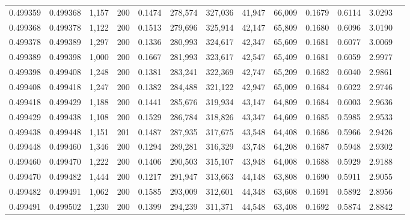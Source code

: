 \begin{tabular}{rrrrrrrrrrrrr}
0.499359 & 0.499368 & 1,157 & 200 &                                     0.1474 & 278,574 & 327,036 &  41,947 &  66,009 & 0.1679 & 0.6114 & 3.0293 \\
0.499368 & 0.499378 & 1,122 & 200 &                                     0.1513 & 279,696 & 325,914 &  42,147 &  65,809 & 0.1680 & 0.6096 & 3.0190 \\
0.499378 & 0.499389 & 1,297 & 200 &                                     0.1336 & 280,993 & 324,617 &  42,347 &  65,609 & 0.1681 & 0.6077 & 3.0069 \\
0.499389 & 0.499398 & 1,000 & 200 &                                     0.1667 & 281,993 & 323,617 &  42,547 &  65,409 & 0.1681 & 0.6059 & 2.9977 \\
0.499398 & 0.499408 & 1,248 & 200 &                                     0.1381 & 283,241 & 322,369 &  42,747 &  65,209 & 0.1682 & 0.6040 & 2.9861 \\
0.499408 & 0.499418 & 1,247 & 200 &                                     0.1382 & 284,488 & 321,122 &  42,947 &  65,009 & 0.1684 & 0.6022 & 2.9746 \\
0.499418 & 0.499429 & 1,188 & 200 &                                     0.1441 & 285,676 & 319,934 &  43,147 &  64,809 & 0.1684 & 0.6003 & 2.9636 \\
0.499429 & 0.499438 & 1,108 & 200 &                                     0.1529 & 286,784 & 318,826 &  43,347 &  64,609 & 0.1685 & 0.5985 & 2.9533 \\
0.499438 & 0.499448 & 1,151 & 201 &                                     0.1487 & 287,935 & 317,675 &  43,548 &  64,408 & 0.1686 & 0.5966 & 2.9426 \\
0.499448 & 0.499460 & 1,346 & 200 &                                     0.1294 & 289,281 & 316,329 &  43,748 &  64,208 & 0.1687 & 0.5948 & 2.9302 \\
0.499460 & 0.499470 & 1,222 & 200 &                                     0.1406 & 290,503 & 315,107 &  43,948 &  64,008 & 0.1688 & 0.5929 & 2.9188 \\
0.499470 & 0.499482 & 1,444 & 200 &                                     0.1217 & 291,947 & 313,663 &  44,148 &  63,808 & 0.1690 & 0.5911 & 2.9055 \\
0.499482 & 0.499491 & 1,062 & 200 &                                     0.1585 & 293,009 & 312,601 &  44,348 &  63,608 & 0.1691 & 0.5892 & 2.8956 \\
0.499491 & 0.499502 & 1,230 & 200 &                                     0.1399 & 294,239 & 311,371 &  44,548 &  63,408 & 0.1692 & 0.5874 & 2.8842 \\

\end{tabular}
